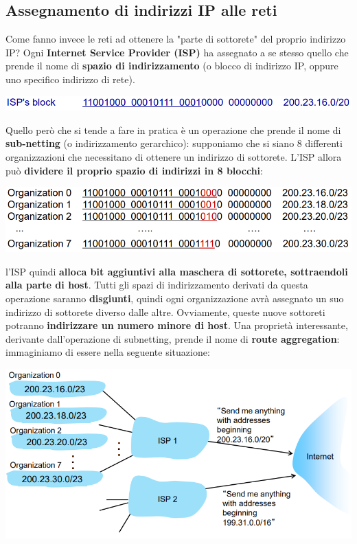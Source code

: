 \documentclass[12pt]{article}
\begin{document}
\subsection{Assegnamento di indirizzi IP alle reti}
Come fanno invece le reti ad ottenere la "parte di sottorete" del proprio indirizzo IP?
Ogni \textbf{Internet Service Provider (ISP)} ha assegnato a se stesso quello che prende il nome di \textbf{spazio di indirizzamento} (o blocco di indirizzo IP, oppure uno specifico indirizzo di rete).
\begin{center}
    \includegraphics[width =0.90\linewidth]{Images/90.png}
\end{center}
Quello però che si tende a fare in pratica è un operazione che prende il nome di \textbf{sub-netting} (o indirizzamento gerarchico): supponiamo che si siano 8 differenti organizzazioni che 
necessitano di ottenere un indirizzo di sottorete. L'ISP allora può \textbf{dividere il proprio spazio di indirizzi in 8 blocchi}:  
\begin{center}
    \includegraphics[width =0.80\linewidth]{Images/91.png}
\end{center}
l'ISP quindi \textbf{alloca bit aggiuntivi alla maschera di sottorete, sottraendoli alla parte di host}.
Tutti gli spazi di indirizzamento derivati da questa operazione saranno \textbf{disgiunti}, quindi ogni organizzazione avrà assegnato un suo indirizzo di sottorete
diverso dalle altre. Ovviamente, queste nuove sottoreti potranno \textbf{indirizzare un numero minore di host}.
Una proprietà interessante, derivante dall'operazione di subnetting, prende il nome di \textbf{route aggregation}:
immaginiamo di essere nella seguente situazione:
\begin{center}
    \includegraphics[width =0.80\linewidth]{Images/92.png}
\end{center}
\end{document}
